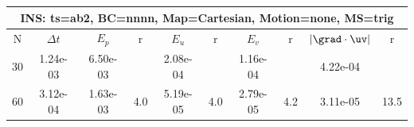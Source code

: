 
\begin{tabular}{|c|c|c|c|c|c|c|c|c|c|} \hline
 \multicolumn{10}{|c|}{INS: ts=ab2, BC=nnnn, Map=Cartesian, Motion=none, MS=trig } \\ \hline 
     N  &   $\Delta t$ & $E_p$   &  r  &   $E_u$   &   r    &   $E_v$   & r   &  $|\grad\cdot\uv|$  & r   \\ \hline 
  30   &  1.24e-03  &   6.50e-03  &        &   2.08e-04  &        &   1.16e-04  &        &   4.22e-04  &        \\ 
  60   &  3.12e-04  &   1.63e-03  & 4.0  &   5.19e-05  & 4.0  &   2.79e-05  & 4.2  &   3.11e-05  & 13.5  \\ 
 \hline 
\end{tabular}
